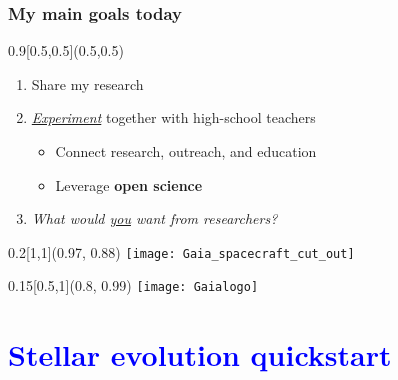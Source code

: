 \documentclass[xcolor=dvipsnames,professionalfonts, aspectratio=169]{beamer}
\begin{document}
\begin{frame}
  \frametitle{My main goals today}


  \begin{textblock}{0.9}[0.5,0.5](0.5,0.5)
    \centering
    \begin{enumerate}\Large
    \item Share my research\\[10pt]
    \item \emph{\underline{Experiment}} together with high-school teachers\\[10pt]
      \begin{itemize}\Large
      \item Connect research, outreach, and education
      \item Leverage \textbf{open science}
      \end{itemize}
    \item<2>[\textbf{Q.}] \emph{What would \underline{you} want from
        researchers?}
    \end{enumerate}
  \end{textblock}


  \begin{textblock}{0.2}[1,1](0.97, 0.88)
    \texttt{[image: Gaia\_spacecraft\_cut\_out]}
  \end{textblock}
  \begin{textblock}{0.15}[0.5,1](0.8, 0.99)
    \texttt{[image: Gaialogo]}
  \end{textblock}

\end{frame}


\section{\textcolor{Blue}{Stellar evolution quickstart}}
\end{document}
